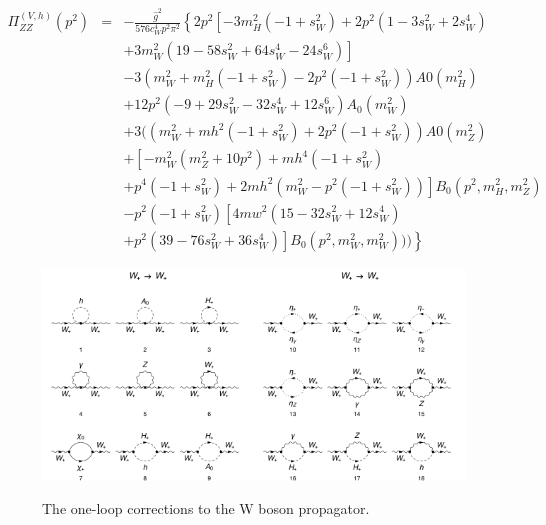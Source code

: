 \documentclass[11pt]{article}
\begin{document}
{
\begin{eqnarray}
\Pi_{ZZ}^{(V,h)}(p^2) &=& 
-\frac{ \hat{g}^2} {576 c_W^4 p^2 \pi^2}\left\{
2 p^2 \left[-3 m_H^2 (-1 + s_W^2) + 2 p^2 (1 - 3 s_W^2 + 2 s_W^4) \right. \right.\nonumber\\
&& \left.+ 3 m_W^2 (19 - 58 s_W^2 + 64 s_W^4 - 24 s_W^6)\right] \nonumber\\
&&- 3 (m_W^2 + m_H^2 (-1 + s_W^2) - 2 p^2 (-1 + s_W^2)) A0\left(m_H^2\right)  \nonumber\\
 &&  + 12 p^2 (-9 + 29 s_W^2 - 32 s_W^4 + 12 s_W^6) A_0\left(m_W^2\right)  \nonumber\\
   && +3 ((m_W^2 + mh^2 (-1 + s_W^2) + 2 p^2 (-1 + s_W^2)) A0\left(m_Z^2\right)  \nonumber\\
   &&+ \left[-m_W^2 (m_Z^2 + 10 p^2) + mh^4 (-1 + s_W^2)\right.  \nonumber\\
   && \left. +     p^4 (-1 + s_W^2) + 2 mh^2 (m_W^2 - p^2 (-1 + s_W^2))\right] B_0\left(p^2, m_H^2, m_Z^2\right)  \nonumber\\
&&   -    p^2 (-1 + s_W^2) \left[4 mw^2 (15 - 32 s_W^2 + 12 s_W^4)\right.  \nonumber\\
&&  \left.      \left. +  p^2 (39 - 76 s_W^2 + 36 s_W^4)\right] B_0\left(p^2, m_W^2, m_W^2\right)))\right\}
\end{eqnarray}
}




\begin{figure}[h!]
\center
\includegraphics[width=0.5\textwidth]{diagrams_V[3]_1_1.pdf}\includegraphics[width=0.5\textwidth]{diagrams_V[3]_1_2.pdf}
\caption{The one-loop corrections to the W boson propagator.}\label{fig:gammagamma}
\end{figure}
\end{document}
